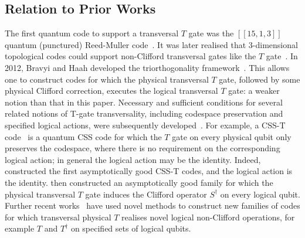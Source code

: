 \documentclass{article}
\begin{document}
\subsection{Relation to Prior Works}

The first quantum code to support a transversal $T$ gate was the $[[15,1,3]]$ quantum (punctured) Reed-Muller code~\cite{knill1996threshold,steane1999quantum,MSD}. It was later realised that 3-dimensional topological codes could support non-Clifford transversal gates like the $T$ gate~\cite{bombin2007topological,kubica2015universal}. In 2012, Bravyi and Haah developed the triorthogonality framework~\cite{bravyi2012magic}. This allows one to construct codes for which the physical transversal $T$ gate, followed by some physical Clifford correction, executes the logical transversal $T$ gate: a weaker notion than that in this paper. Necessary and sufficient conditions for several related notions of T-gate transversality, including codespace preservation and specified logical actions, were subsequently developed~\cite{rengaswamy2020optimality,hu2022designing}. For example, a CSS-T code~\cite{rengaswamy2020optimality,camps2024toward,camps2024algebraic,camps2024binary,bodur2026schur} is a quantum CSS code for which the $T$ gate on every physical qubit only preserves the codespace, where there is no requirement on the corresponding logical action; in general the logical action may be the identity. Indeed,~\cite{Berardini2025AsymptoticallyGoodCSST} constructed the first asymptotically good CSS-T codes, and the logical action is the identity. \cite{Reddy2026AsymptoticallyGoodCSS} then constructed an asymptotically good family for which the physical transversal $T$ gate induces the Clifford operator $S^\dagger$ on every logical qubit. Further recent works~\cite{cao2026quantum,reddy2026realizing} have used novel methods to construct new families of codes for which transversal physical $T$ realises novel logical non-Clifford operations, for example $T$ and $T^\dagger$ on specified sets of logical qubits.
\end{document}
